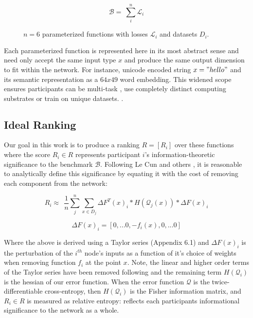 \documentclass{article}
\begin{document}
\begin{equation}
\mathcal{B} = \ \sum_{i}^{n} \mathcal{L}_i 
\end{equation}

\begin{figure}[H]
	\centering
	\hspace*{-2cm}
	
	\caption{$n=6$ parameterized functions with losses $\mathcal{L}_i$ and datasets $D_i$.}
\end{figure}{}

Each parameterized function is represented here in its most abstract sense\cite{hinton2015distilling} and need only accept the same input type $x$ and produce the same output dimension to fit within the network. {\color{blue} For instance, unicode encoded string $x = "hello"$ and its semantic representation as a $64x49$ word embedding.} This widened scope ensures participants can be multi-task \cite{kaiser2017model}, use completely distinct computing substrates \cite{alex2014cortical} or train on unique datasets. \cite{lample2019crosslingual}. 

\subsection{Ideal Ranking}

Our goal in this work is to produce a ranking $R = [R_i]$ over these functions where the score $R_i \in R$ represents participant $i$'s information-theoretic significance to the benchmark $\mathcal{B}$. Following Le Cun and others \cite{lecun1989optimalbraindamage,yu2017nisp}, it is reasonable to analytically define this significance by equating it with the cost of removing each component from the network:
\bigskip

\begin{equation}
R_i \approx \ \ \frac{1}{n} \sum_{j}^{n} \sum_{x \in D_j} \Delta F^T(x)_i * H(\mathcal{Q}_j(x)) * \Delta F(x)_i 
\end{equation}

\[ \Delta F (x)_i = [0, ... 0, -f_i(x), 0, ... 0] \]

Where the above is derived using a Taylor series (Appendix 6.1) and $\Delta F (x)_i$ is the {\color{blue} perturbation of the $i^{th}$ node's inputs as a function of it's choice of weights when removing function $f_i$ at the point $x$}. Note, the linear and higher order terms of the Taylor series have been removed following \cite{yu2017nisp} and the remaining term $H(\mathcal{Q}_i)$ is the hessian of our error function. When the error function $\mathcal{Q}$ is the twice-differentiable cross-entropy, then $H(\mathcal{Q}_i)$ is the Fisher information matrix, and $R_i \in R$ is measured as relative entropy: reflects each participants informational significance to the network as a whole.
\bigskip
\end{document}
